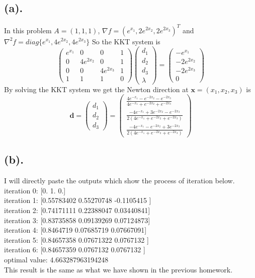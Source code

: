 \documentclass[12pt,letterpaper]{article}
\begin{document}
\section{}
\subsection*{(a).}
In this problem $A=(1,1,1)$, $\nabla f=(e^{x_1},2e^{2x_2},2e^{2x_3})^T$ and $\nabla^2f=diag\{e^{x_1},4e^{2x_2},4e^{2x_3}\}$
So the KKT system is 
$$\begin{pmatrix}
    e^{x_1}&0&0&1\\
    0&4e^{2x_2}&0&1\\
    0&0&4e^{2x_3}&1\\
    1&1&1&0
\end{pmatrix}
\begin{pmatrix}
d_1\\d_2\\d_3\\\lambda
\end{pmatrix}=
\begin{pmatrix}
-e^{x_1}\\-2e^{2x_2}\\-2e^{2x_3}\\0
\end{pmatrix}
$$
By solving the KKT system we get the Newton direction at $\boldsymbol{x}=(x_1,x_2,x_3)$ is 
$$\boldsymbol{d}=\begin{pmatrix}
d_1\\d_2\\d_3
\end{pmatrix}=\begin{pmatrix}
\frac{4e^{-x_1}-e^{-2x_2}-e^{-2x_3}}{4e^{-x_1}+e^{-2x_2}+e^{-2x_3}}\\
\frac{-4e^{-x_1}+3e^{-2x_2}-e^{-2x_3}}{2(4e^{-x_1}+e^{-2x_2}+e^{-2x_3})}\\
\frac{-4e^{-x_1}-e^{-2x_2}+3e^{-2x_3}}{2(4e^{-x_1}+e^{-2x_2}+e^{-2x_3})}
\end{pmatrix}
$$
\subsection*{(b).}
I will directly paste the outputs which show the process of iteration below.\\
iteration 0: [0. 1. 0.]\\
iteration 1: [0.55783402  0.55270748 -0.1105415 ]\\
iteration 2: [0.74171111 0.22388047 0.03440841]\\
iteration 3: [0.83735858 0.09139269 0.07124873]\\
iteration 4: [0.8464719  0.07685719 0.07667091]\\
iteration 5: [0.84657358 0.07671322 0.0767132 ]\\
iteration 6: [0.84657359 0.0767132  0.0767132 ]\\
optimal value: 4.663287963194248\\
This result is the same as what we have shown in the previous homework.
\end{document}
